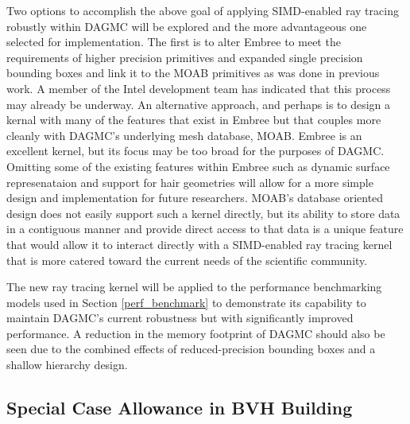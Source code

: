 \documentclass[12pt, a4paper]{article}
\begin{document}



Two options to accomplish the above goal of applying SIMD-enabled ray tracing robustly within DAGMC will be explored and the more advantageous one selected for implementation. The first is to alter Embree to meet the requirements of higher precision primitives and expanded single precision bounding boxes and link it to the MOAB primitives as was done in previous work. A member of the Intel development team has indicated that this process may already be underway. An alternative approach, and perhaps is to design a kernal with many of the features that exist in Embree but that couples more cleanly with DAGMC's underlying mesh database, MOAB. Embree is an excellent kernel, but its focus may be too broad for the purposes of DAGMC. Omitting some of the existing features within Embree such as dynamic surface represenataion and support for hair geometries \cite{Woop_2014} will allow for a more simple design and implementation for future researchers. MOAB's database oriented design does not easily support such a kernel directly, but its ability to store data in a contiguous manner and provide direct access to that data is a unique feature that would allow it to interact directly with a SIMD-enabled ray tracing kernel that is more catered toward the current needs of the scientific community.

The new ray tracing kernel will be applied to the performance benchmarking models used in Section \ref{perf_benchmark} to demonstrate its capability to maintain DAGMC's current robustness but with significantly improved performance. A reduction in the memory footprint of DAGMC should also be seen due to the combined effects of reduced-precision bounding boxes and a shallow hierarchy design.

\subsection{Special Case Allowance in BVH Building}
\end{document}
